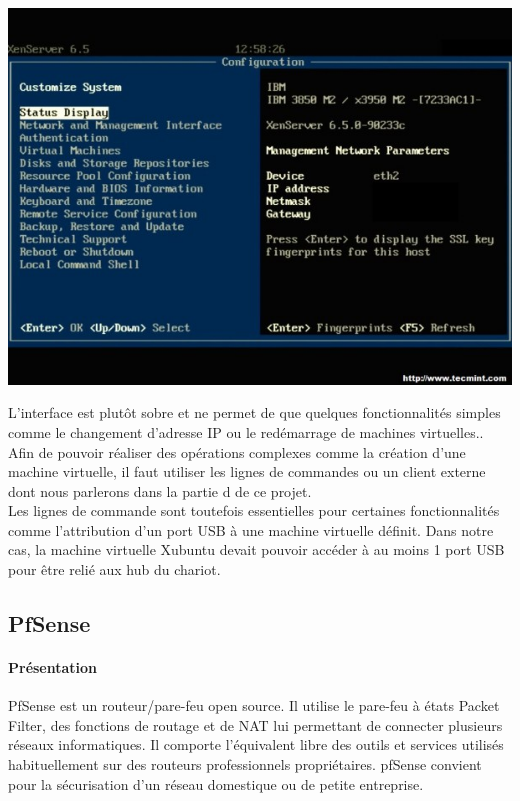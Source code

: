\documentclass[a4paper,12pt]{extarticle}
\begin{document}
\begin{center}
\includegraphics[scale=0.60]{xenserver18}\\
\end{center}

L’interface est plutôt sobre et ne permet de que quelques fonctionnalités simples comme le changement d’adresse IP ou le redémarrage de machines virtuelles.. Afin de pouvoir réaliser des opérations complexes comme la création d’une machine virtuelle, il faut utiliser les lignes de commandes ou un client externe dont nous parlerons dans la partie d de ce projet.\\

Les lignes de commande sont toutefois essentielles pour certaines fonctionnalités comme l’attribution d’un port USB à une machine virtuelle définit. Dans notre cas, la machine virtuelle Xubuntu devait pouvoir accéder à au moins 1 port USB pour être relié aux hub du chariot.

\subsection{PfSense}
\paragraph{Présentation\\}

PfSense est un routeur/pare-feu open source. Il utilise le pare-feu à états Packet Filter, des fonctions de routage et de NAT lui permettant de connecter plusieurs réseaux informatiques. Il comporte l'équivalent libre des outils et services utilisés habituellement sur des routeurs professionnels propriétaires. pfSense convient pour la sécurisation d'un réseau domestique ou de petite entreprise.
\end{document}
